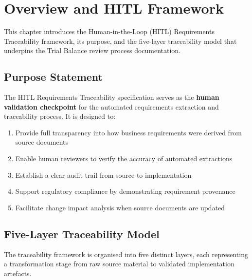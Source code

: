 \documentclass[11pt,a4paper,twoside]{report}
\begin{document}
\chapter{Overview and HITL Framework}
\label{ch:overview}

This chapter introduces the Human-in-the-Loop (HITL) Requirements
Traceability framework, its purpose, and the five-layer traceability
model that underpins the Trial Balance review process documentation.

\section{Purpose Statement}
\label{sec:purpose}

The HITL Requirements Traceability specification serves as the
\textbf{human validation checkpoint} for the automated requirements
extraction and traceability process. It is designed to:

\begin{enumerate}
\item Provide full transparency into how business requirements were
derived from source documents
\item Enable human reviewers to verify the accuracy of automated
extractions
\item Establish a clear audit trail from source to implementation
\item Support regulatory compliance by demonstrating requirement
provenance
\item Facilitate change impact analysis when source documents are
updated
\end{enumerate}

\section{Five-Layer Traceability Model}
\label{sec:five-layer-model}

The traceability framework is organised into five distinct layers,
each representing a transformation stage from raw source material
to validated implementation artefacts.
\end{document}
